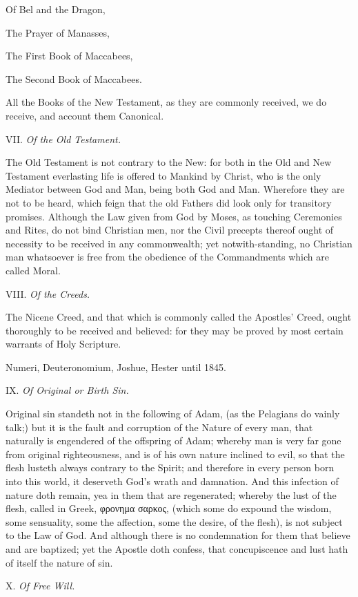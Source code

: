 Of Bel and the Dragon,

The Prayer of Manasses,

The First Book of Maccabees,

The Second Book of Maccabees.

All
the Books of the New Testament, as they are commonly received, we do receive,
and account them Canonical.

VII.
\emph{Of the Old Testament.}

The
Old Testament is not contrary to the New: for both in the Old and New
Testament everlasting life is offered to Mankind by Christ, who is the
only Mediator between God and Man, being both God and Man. Wherefore they
are not to be heard, which feign that the old Fathers did look only for
transitory promises. Although the Law given from God by Moses, as touching
Ceremonies and Rites, do not bind Christian men, nor the Civil precepts
thereof ought of necessity to be received in any commonwealth; yet notwith-standing,
no Christian man whatsoever is free from the obedience of the Commandments
which are called Moral.

VIII.
\emph{Of the Creeds.}

The
Nicene Creed, and that which is commonly called the Apostles’ Creed,
ought thoroughly to be received and believed: for they may be proved by
most certain warrants of Holy Scripture.

Numeri,
Deuteronomium, Joshue, Hester
until 1845.

IX.
\emph{Of Original or Birth Sin.}

Original sin standeth not in the following of Adam, (as the Pelagians
do vainly talk;) but it is the fault and corruption of the Nature of every
man, that naturally is engendered of the offspring of Adam; whereby man
is very far gone from original righteousness, and is of his own nature
inclined to evil, so that the flesh lusteth always contrary to the Spirit;
and therefore in every person born into this world, it deserveth God’s
wrath and damnation. And this infection of nature doth remain, yea in
them that are regenerated; whereby the lust of the flesh, called in Greek,
φρονημα σαρκος,
(which some do expound the wisdom, some sensuality, some the affection,
some the desire, of the flesh), is not subject to the Law of God. And
although there is no condemnation for them that believe and are baptized;
yet the Apostle doth confess, that concupiscence and lust hath of itself
the nature of sin.

X. \emph{Of Free Will.}

